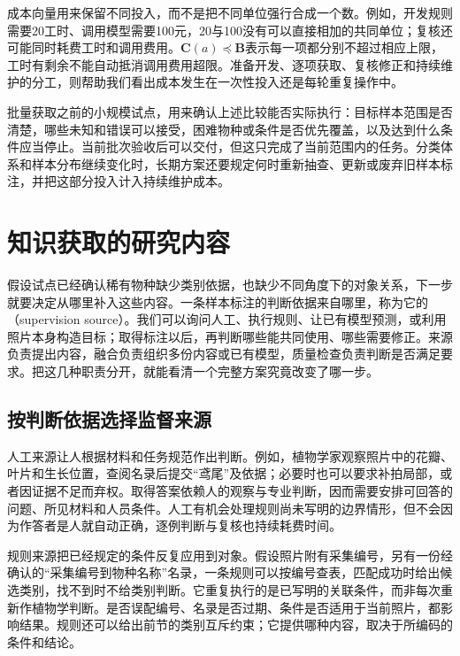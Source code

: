 成本向量用来保留不同投入，而不是把不同单位强行合成一个数。例如，开发规则需要20工时、调用模型需要100元，20与100没有可以直接相加的共同单位；复核还可能同时耗费工时和调用费用。$\bm{C}(a)\preceq\bm{B}$表示每一项都分别不超过相应上限，工时有剩余不能自动抵消调用费用超限。准备开发、逐项获取、复核修正和持续维护的分工，则帮助我们看出成本发生在一次性投入还是每轮重复操作中。

批量获取之前的小规模试点，用来确认上述比较能否实际执行：目标样本范围是否清楚，哪些未知和错误可以接受，困难物种或条件是否优先覆盖，以及达到什么条件应当停止。当前批次验收后可以交付，但这只完成了当前范围内的任务。分类体系和样本分布继续变化时，长期方案还要规定何时重新抽查、更新或废弃旧样本标注，并把这部分投入计入持续维护成本。

\section{知识获取的研究内容}
\label{sec:knowledge-acquisition-research-scope}

假设试点已经确认稀有物种缺少类别依据，也缺少不同角度下的对象关系，下一步就要决定从哪里补入这些内容。一条样本标注的判断依据来自哪里，称为它的（supervision source）。我们可以询问人工、执行规则、让已有模型预测，或利用照片本身构造目标；取得标注以后，再判断哪些能共同使用、哪些需要修正。来源负责提出内容，融合负责组织多份内容或已有模型，质量检查负责判断是否满足要求。把这几种职责分开，就能看清一个完整方案究竟改变了哪一步。

\subsection{按判断依据选择监督来源}
\label{sec:knowledge-acquisition-source-selection}

人工来源让人根据材料和任务规范作出判断。例如，植物学家观察照片中的花瓣、叶片和生长位置，查阅名录后提交“鸢尾”及依据；必要时也可以要求补拍局部，或者因证据不足而弃权。取得答案依赖人的观察与专业判断，因而需要安排可回答的问题、所见材料和人员条件。人工有机会处理规则尚未写明的边界情形，但不会因为作答者是人就自动正确，逐例判断与复核也持续耗费时间。

规则来源把已经规定的条件反复应用到对象。假设照片附有采集编号，另有一份经确认的“采集编号到物种名称”名录，一条规则可以按编号查表，匹配成功时给出候选类别，找不到时不给类别判断。它重复执行的是已写明的关联条件，而非每次重新作植物学判断。是否误配编号、名录是否过期、条件是否适用于当前照片，都影响结果。规则还可以给出前节的类别互斥约束；它提供哪种内容，取决于所编码的条件和结论。


